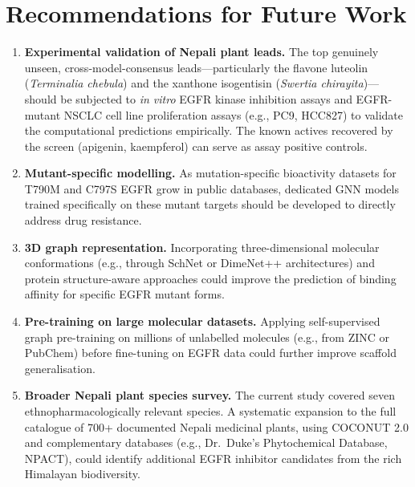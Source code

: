 \section{Recommendations for Future Work}

\begin{enumerate}
    \item \textbf{Experimental validation of Nepali plant leads.} The top genuinely
          unseen, cross-model-consensus leads---particularly the flavone luteolin
          (\textit{Terminalia chebula}) and the xanthone isogentisin
          (\textit{Swertia chirayita})---should be subjected to \textit{in vitro} EGFR
          kinase inhibition assays and EGFR-mutant NSCLC cell line proliferation assays
          (e.g., PC9, HCC827) to validate the computational predictions empirically.
          The known actives recovered by the screen (apigenin, kaempferol) can serve as
          assay positive controls.

    \item \textbf{Mutant-specific modelling.} As mutation-specific bioactivity datasets
          for T790M and C797S EGFR grow in public databases, dedicated GNN models trained
          specifically on these mutant targets should be developed to directly address
          drug resistance.

    \item \textbf{3D graph representation.} Incorporating three-dimensional molecular
          conformations (e.g., through SchNet or DimeNet++ architectures) and protein
          structure-aware approaches could improve the prediction of binding affinity
          for specific EGFR mutant forms.

    \item \textbf{Pre-training on large molecular datasets.} Applying self-supervised
          graph pre-training on millions of unlabelled molecules (e.g., from ZINC or
          PubChem) before fine-tuning on EGFR data could further improve scaffold
          generalisation.

    \item \textbf{Broader Nepali plant species survey.} The current study covered
          seven ethnopharmacologically relevant species. A systematic expansion to the
          full catalogue of 700+ documented Nepali medicinal plants, using COCONUT 2.0
          and complementary databases (e.g., Dr.\ Duke's Phytochemical Database, NPACT),
          could identify additional EGFR inhibitor candidates from the rich Himalayan
          biodiversity.


\end{enumerate}
